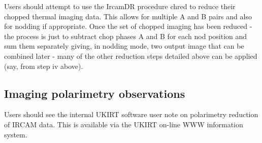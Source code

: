 Users should attempt to use the IrcamDR procedure chred to reduce their
chopped thermal imaging data.  This allows for multiple A and B pairs and
also for nodding if appropriate.  Once the set of chopped imaging has
been reduced - the process is just to subtract chop phases A and B for
each nod position and sum them separately giving, in nodding mode, two
output image that can be combined later - many of the other reduction
steps detailed above can be applied (say, from step iv above).
 
\subsection{Imaging polarimetry observations}
 
Users should see the internal {\sc UKIRT} software user note on polarimetry
reduction of IRCAM data.  This is available via the {\sc UKIRT}  on-line WWW
information system.


%


